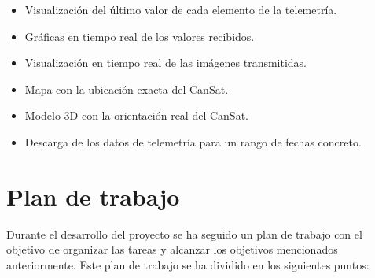 \begin{itemize}
\begin{itemize}
\begin{itemize}
            \item Visualización del último valor de cada elemento de la telemetría.
            \item Gráficas en tiempo real de los valores recibidos.
            \item Visualización en tiempo real de las imágenes transmitidas.
            \item Mapa con la ubicación exacta del CanSat.
            \item Modelo 3D con la orientación real del CanSat.
            \item Descarga de los datos de telemetría para un rango de fechas concreto.
        \end{itemize}
    \end{itemize}
\end{itemize}


\section{Plan de trabajo}
Durante el desarrollo del proyecto se ha seguido un plan de trabajo con el objetivo de organizar las tareas y alcanzar los objetivos mencionados anteriormente.
Este plan de trabajo se ha dividido en los siguientes puntos:

